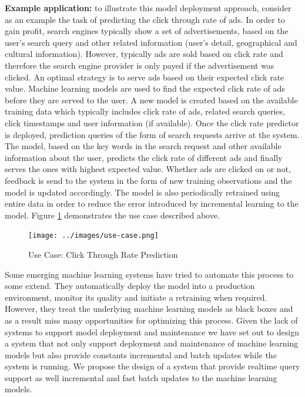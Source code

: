 \documentclass{sig-alternate-05-2015}
\begin{document}
\textbf{Example application:} to illustrate this model deployment approach, consider as an example the task of predicting the click through rate of ads.
In order to gain profit, search engines typically show a set of advertisements, based on the user's search query and other related information (user's detail, geographical and cultural information).
However, typically ads are sold based on click rate and therefore the search engine provider is only payed if the advertisement was clicked.
An optimal strategy is to serve ads based on their expected click rate value.
Machine learning models are used to find the expected click rate of ads before they are served to the user.
A new model is created based on the available training data which typically includes click rate of ads, related search queries, click timestamps and user information (if available). 
Once the click rate predictor is deployed, prediction queries of the form of search requests arrive at the system.
The model, based on the key words in the search request and other available information about the user, predicts the click rate of different ads and finally serves the ones with highest expected value.
Whether ads are clicked on or not, feedback is send to the system in the form of new training observations and the model is updated accordingly.
The model is also periodically retrained using entire data in order to reduce the error introduced by incremental learning to the model.
Figure \ref{fig:click-rate} demonstrates the use case described above.

\begin{figure}[h]
\centering
\texttt{[image: ../images/use-case.png]}
\caption{Use Case: Click Through Rate Prediction}
\label{fig:click-rate}
\end{figure}

Some emerging machine learning systems have tried to automate this process to some extend.
They automatically deploy the model into a production environment, monitor its quality and initiate a retraining when required.
However, they treat the underlying machine learning models as black boxes and as a result miss many opportunities for optimizing this process.
Given the lack of systems to support model deployment and maintenance we have set out to design a system that not only support deployment and maintenance of machine learning models but also provide constants incremental and batch updates while the system is running. 
We propose the design of a system that provide realtime query support as well incremental and fast batch updates to the machine learning models.
\end{document}
